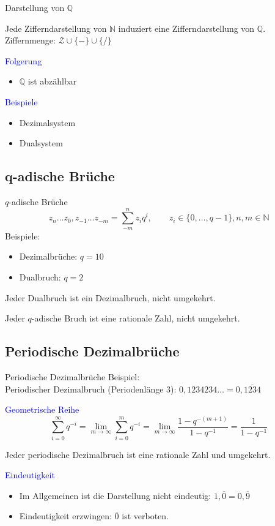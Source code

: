 \documentclass[12pt%
,aspectratio=169%
]{beamer}
\begin{document}
\begin{frame}{Darstellung von $\mathbb{Q}$}
\begin{theorem}
Jede Zifferndarstellung von $\mathbb{N}$ induziert eine Zifferndarstellung von $\mathbb{Q}$.\\
Ziffernmenge: $\mathcal{Z} \cup \{-\} \cup \{/\}$
\end{theorem}
\textcolor{blue}{Folgerung}
\begin{itemize}
	\item $\mathbb{Q}$ ist abzählbar
\end{itemize}
\textcolor{blue}{Beispiele}
\begin{itemize}
	\item Dezimalsystem
	\item Dualsystem
\end{itemize}
\end{frame}

\subsection{q-adische Brüche}
\begin{frame}{$q$-adische Brüche}
$$
	z_n \ldots z_0, z_{-1} \ldots z_{-m} = \sum_{-m}^n z_i q^i, \qquad z_i \in \{0, \ldots, q-1\}, n,m \in \mathbb{N}
$$
Beispiele:
\begin{itemize}
	\item Dezimalbrüche: $q = 10$
	\item Dualbruch: $q = 2$
\end{itemize}
\begin{theorem}
Jeder Dualbruch ist ein Dezimalbruch, nicht umgekehrt.
\end{theorem}
\begin{theorem}
Jeder $q$-adische Bruch ist eine rationale Zahl, nicht umgekehrt.
\end{theorem}
\end{frame}

\subsection*{Periodische Dezimalbrüche}
\begin{frame}{Periodische Dezimalbrüche}
Beispiel:\\
Periodischer Dezimalbruch (Periodenlänge 3): $0,1234234 \ldots = 0,\overline{1234}$

\textcolor{blue}{Geometrische Reihe}
$$
	\sum_{i=0}^\infty q^{-i} = \lim_{m \to \infty} \sum_{i=0}^m q^{-i} = \lim_{m \to \infty} \frac{1 -q^{-(m+1)}}{1 - q^{-1}} = \frac{1}{1 - q^{-1}}
$$
\begin{theorem}
Jeder periodische Dezimalbruch ist eine rationale Zahl und umgekehrt.
\end{theorem}
\textcolor{blue}{Eindeutigkeit}
\begin{itemize}
	\item Im Allgemeinen ist die Darstellung nicht eindeutig: $1,\overline{0} = 0,\overline{9}$
	\item Eindeutigkeit erzwingen: $\overline{0}$ ist verboten.
\end{itemize}
\end{frame}
\end{document}
